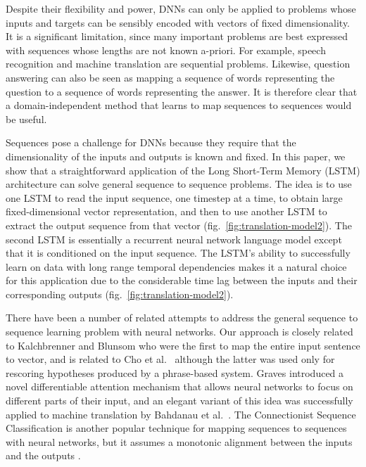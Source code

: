 \documentclass{article} \usepackage{nips14submit_e}
\begin{document}
Despite their flexibility and power, DNNs can only be applied to
problems whose inputs and targets can be sensibly encoded with vectors
of fixed dimensionality.  It is a significant limitation, since many
important problems are best expressed with sequences whose lengths are
not known a-priori.  For example, speech recognition and machine
translation are sequential problems.  Likewise, question answering can
also be seen as mapping a sequence of words representing the question
to a sequence of words representing the answer.  It is therefore clear
that a domain-independent method that learns to map sequences to
sequences would be useful.

Sequences pose a challenge for DNNs because they require that the
dimensionality of the inputs and outputs is known and fixed.  
In this paper, we show that a straightforward application of the Long
Short-Term Memory (LSTM) architecture \cite{hochreiter97} can solve
general sequence to sequence problems.  The idea is to use one LSTM to
read the input sequence, one timestep at a time, to obtain large
fixed-dimensional vector representation, and then to use another LSTM
to extract the output sequence from that vector
(fig.~\ref{fig:translation-model2}).  The second LSTM is essentially a
recurrent neural network language model
\cite{rumelhart1986learning,mikolov2010recurrent,sundermeyer12} except
that it is conditioned on the input sequence.  The LSTM's ability to
successfully learn on data with long range temporal dependencies makes
it a natural choice for this application due to the considerable time
lag between the inputs and their corresponding outputs
(fig.~\ref{fig:translation-model2}).

There have been a number of related attempts to address the general
sequence to sequence learning problem with neural networks.   Our
approach is closely related to Kalchbrenner and Blunsom \cite{kal13} who were
the first to map the entire input sentence to vector, and is related 
to Cho et al.~\cite{cho14} although the latter was used only for rescoring hypotheses
produced by a phrase-based system.  Graves
\cite{graves13c} introduced a novel differentiable attention mechanism
that allows neural networks to focus on different parts
of their input, and an elegant variant of this idea was successfully
applied to machine translation by Bahdanau et al.~\cite{bog14}.  The Connectionist
Sequence Classification is another popular technique for mapping sequences
to sequences with neural networks, but it assumes a monotonic alignment
between the inputs and the outputs \cite{graves1}.
\end{document}
